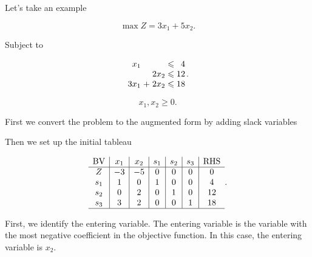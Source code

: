\documentclass{report}
\begin{document}
Let's take an example

\[
	\max Z = 3x_1 + 5x_2
	.\]

Subject to

\[
	\arraycolsep=1.4pt
	\begin{array}{rrrrrrr}
		x_1  &   &      & \leq & 4  \\
		     &   & 2x_2 & \leq & 12 \\
		3x_1 & + & 2x_2 & \leq & 18
	\end{array}
	.\]

\[
	x_1, x_2 \geq 0
	.\]

First we convert the problem to the augmented form by adding slack variables

\begin{center}
\end{center}

Then we set up the initial tableau

\[
	\begin{array}{c|c|c|c|c|c|c}
		\text{BV} & x_1 & x_2 & s_1 & s_2 & s_3 & \text{RHS} \\
		\hline
		Z         & -3  & -5  & 0   & 0   & 0   & 0          \\
		s_1       & 1   & 0   & 1   & 0   & 0   & 4          \\
		s_2       & 0   & 2   & 0   & 1   & 0   & 12         \\
		s_3       & 3   & 2   & 0   & 0   & 1   & 18         \\
		\hline
	\end{array}
	.\]


First, we identify the entering variable. The entering variable is the variable with the most negative coefficient in the objective function.
In this case, the entering variable is $x_2$.
\end{document}
